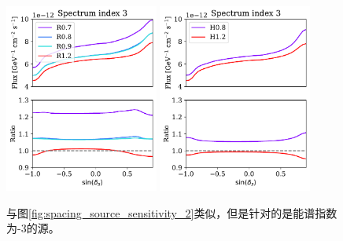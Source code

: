 \begin{figure}[!htb]%
    \centering
    \includegraphics[width=0.45\textwidth]{img/spacing/source_sensitivity_3_hori.pdf}
    \includegraphics[width=0.45\textwidth]{img/spacing/source_sensitivity_3_vert.pdf}
    \caption{与图\ref{fig:spacing_source_sensitivity_2}类似，但是针对的是能谱指数为-3的源。}
    \label{fig:spacing_source_sensitivity_3}
\end{figure}
